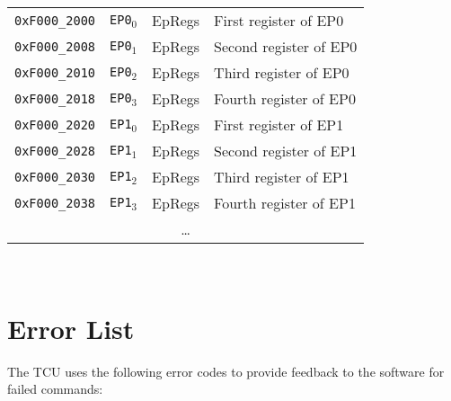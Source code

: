 \begin{tabular}{ p{3cm} | c | c | l }
  \hline
  \hline
  \texttt{0xF000\_2000} & \texttt{EP0$_0$} & EpRegs & First register of EP0 \\
  \texttt{0xF000\_2008} & \texttt{EP0$_1$} & EpRegs & Second register of EP0 \\
  \texttt{0xF000\_2010} & \texttt{EP0$_2$} & EpRegs & Third register of EP0 \\
  \texttt{0xF000\_2018} & \texttt{EP0$_3$} & EpRegs & Fourth register of EP0 \\
  \hline
  \texttt{0xF000\_2020} & \texttt{EP1$_0$} & EpRegs & First register of EP1 \\
  \texttt{0xF000\_2028} & \texttt{EP1$_1$} & EpRegs & Second register of EP1 \\
  \texttt{0xF000\_2030} & \texttt{EP1$_2$} & EpRegs & Third register of EP1 \\
  \texttt{0xF000\_2038} & \texttt{EP1$_3$} & EpRegs & Fourth register of EP1 \\
  \hline
  \multicolumn{4}{c}{\dots} \\
  \hline
  \hline
\end{tabular}\\[1em]

\section{Error List}

The TCU uses the following error codes to provide feedback to the software for failed commands:

